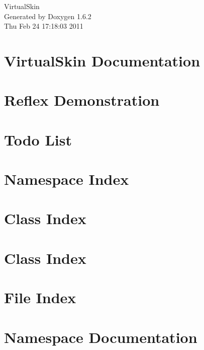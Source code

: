 \documentclass[a4paper]{book}
\begin{document}
\hypersetup{pageanchor=false}
\begin{titlepage}
\vspace*{7cm}
\begin{center}
{\Large VirtualSkin }\\
\vspace*{1cm}
{\large Generated by Doxygen 1.6.2}\\
\vspace*{0.5cm}
{\small Thu Feb 24 17:18:03 2011}\\
\end{center}
\end{titlepage}
\clearemptydoublepage
{}
\tableofcontents
\clearemptydoublepage
{}
\hypersetup{pageanchor=true}
\chapter{VirtualSkin Documentation}
\label{index}\hypertarget{index}{}
\chapter{Reflex Demonstration}
\label{reflexDemo}
\hypertarget{reflexDemo}{}

\chapter{Todo List}
\label{todo}
\hypertarget{todo}{}

\chapter{Namespace Index}

\chapter{Class Index}

\chapter{Class Index}

\chapter{File Index}

\chapter{Namespace Documentation}




\end{document}
